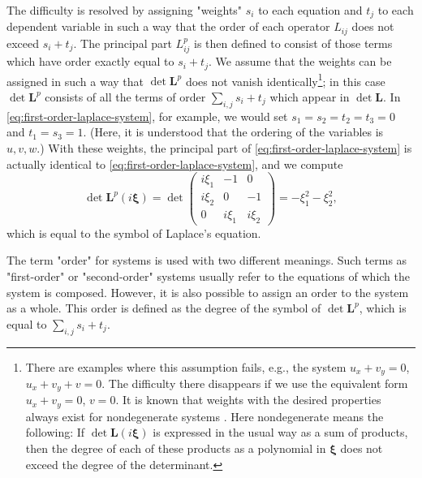 The difficulty is resolved by assigning "weights" $s_i$ to each equation and $t_j$ to each dependent variable in such a way that the order of each operator $L_{ij}$ does not exceed $s_i+t_j$. The principal part $L_{ij}^p$ is then defined to consist of those terms which have order exactly equal to $s_i+t_j$. We assume that the weights can be assigned in such a way that $\det\bm{L}^p$ does not vanish identically\footnote{There are examples where this assumption fails, e.g., the system $u_x+v_y=0$, $u_x+v_y+v=0$. The difficulty there disappears if we use the equivalent form $u_x+v_y=0$, $v=0$. It is known that weights with the desired properties always exist for nondegenerate systems \cite{Vo}. Here nondegenerate means the following: If $\det\bm{L}(i\bm{\xi})$ is expressed in the usual way as a sum of products, then the degree of each of these products as a polynomial in $\bm{\xi}$ does not exceed the degree of the determinant.}; in this case $\det\bm{L}^p$ consists of all the terms of order $\sum_{i,j}s_i+t_j$ which appear in $\det\bm{L}$. In \eqref{eq:first-order-laplace-system}, for example, we would set $s_1=s_2=t_2=t_3=0$ and $t_1=s_3=1$. (Here, it is understood that the ordering of the variables is $u,v,w$.) With these weights, the principal part of \eqref{eq:first-order-laplace-system} is actually identical to \eqref{eq:first-order-laplace-system}, and we compute
\begin{equation}\label{eq:weighted-laplace-principal-determinant}
\det\bm{L}^p(i\bm{\xi})=\det\begin{pmatrix}i\xi_1&-1&0\\i\xi_2&0&-1\\0&i\xi_1&i\xi_2\end{pmatrix}=-\xi_1^2-\xi_2^2,
\end{equation}
which is equal to the symbol of Laplace's equation.

The term "order" for systems is used with two different meanings. Such terms as "first-order" or "second-order" systems usually refer to the equations of which the system is composed. However, it is also possible to assign an order to the system as a whole. This order is defined as the degree of the symbol of $\det\bm{L}^p$, which is equal to $\sum_{i,j}s_i+t_j$.

